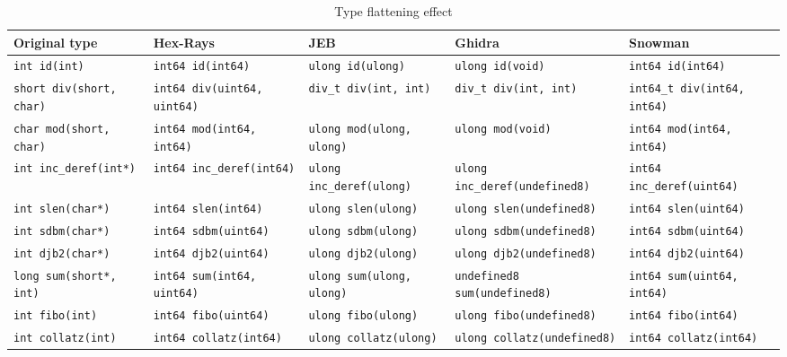 \documentclass[a4paper]{llncs}
\begin{document}
\begin{table}
	\begin{adjustwidth}{-6.21in}{-5.95in}
		\begin{center}
			\caption{Type flattening effect}\label{flattening}
			\begin{tabular}{|l|l|l|l|l|}
				\hline
				Original type & Hex-Rays & JEB & Ghidra & Snowman \\
				\hline
				\texttt{int id(int)} & \texttt{int64 id(int64)} & \texttt{ulong id(ulong)} &
				\texttt{ulong id(void)} & \texttt{int64 id(int64)} \\
				\hline
				\texttt{short div(short, char)} & \texttt{int64 div(uint64, uint64)} & \texttt{div\_t div(int, int)} &
				\texttt{div\_t div(int, int)} & \texttt{int64\_t div(int64, int64)} \\
				\hline
				\texttt{char mod(short, char)} & \texttt{int64 mod(int64, int64)} & \texttt{ulong mod(ulong, ulong)} &
				\texttt{ulong mod(void)} & \texttt{int64 mod(int64, int64)} \\
				\hline
				\texttt{int inc\_deref(int*)} & \texttt{int64 inc\_deref(int64)} & \texttt{ulong inc\_deref(ulong)} &
				\texttt{ulong inc\_deref(undefined8)} & \texttt{int64 inc\_deref(uint64)} \\
				\hline
				\texttt{int slen(char*)} & \texttt{int64 slen(int64)} & \texttt{ulong slen(ulong)} &
				\texttt{ulong slen(undefined8)} & \texttt{int64 slen(uint64)} \\
				\hline
				\texttt{int sdbm(char*)} & \texttt{int64 sdbm(uint64)} & \texttt{ulong sdbm(ulong)} &
				\texttt{ulong sdbm(undefined8)} & \texttt{int64 sdbm(uint64)} \\
				\hline
				\texttt{int djb2(char*)} & \texttt{int64 djb2(uint64)} & \texttt{ulong djb2(ulong)} &
				\texttt{ulong djb2(undefined8)} & \texttt{int64 djb2(uint64)} \\
				\hline
				\texttt{long sum(short*, int)} & \texttt{int64 sum(int64, uint64)} &
				\texttt{ulong sum(ulong, ulong)} & \texttt{undefined8 sum(undefined8)} & \texttt{int64 sum(uint64, int64)} \\
				\hline
				\texttt{int fibo(int)} & \texttt{int64 fibo(uint64)} & \texttt{ulong fibo(ulong)} &
				\texttt{ulong fibo(undefined8)} & \texttt{int64 fibo(int64)} \\
				\hline
				\texttt{int collatz(int)} & \texttt{int64 collatz(int64)} & \texttt{ulong collatz(ulong)} &
				\texttt{ulong collatz(undefined8)} & \texttt{int64 collatz(int64)} \\
				\hline
			\end{tabular}
		\end{center}
	\end{adjustwidth}
\end{table}
\end{document}
